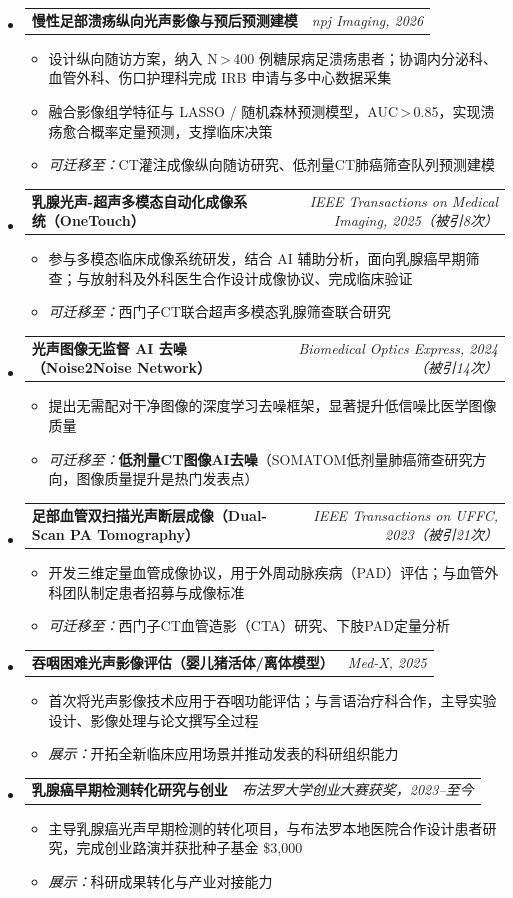 \documentclass[letterpaper,10pt]{article}
\makeatletter
\newcommand{\projheading}[2]{
  \vspace{1pt}\item
  \begin{tabular*}{0.97\textwidth}[t]{l@{\extracolsep{\fill}}r}
    \textbf{#1} & \textit{\small#2} \\
  \end{tabular*}\vspace{2pt}
}
\newcommand{\projItemListStart}{\begin{itemize}[leftmargin=0.2in, topsep=3pt]}
\newcommand{\projItemListEnd}{\end{itemize}\vspace{2pt}}
\makeatother
\begin{document}
\begin{itemize}[leftmargin=0in, label={}]

  \projheading{慢性足部溃疡纵向光声影像与预后预测建模}{npj Imaging, 2026}
  \projItemListStart
    \item 设计纵向随访方案，纳入 N\,>\,400 例糖尿病足溃疡患者；协调内分泌科、血管外科、伤口护理科完成 IRB 申请与多中心数据采集
    \item 融合影像组学特征与 LASSO / 随机森林预测模型，AUC\,>\,0.85，实现溃疡愈合概率定量预测，支撑临床决策
    \item \textit{可迁移至：}CT灌注成像纵向随访研究、低剂量CT肺癌筛查队列预测建模
  \projItemListEnd

  \projheading{乳腺光声-超声多模态自动化成像系统（OneTouch）}{IEEE Transactions on Medical Imaging, 2025（被引8次）}
  \projItemListStart
    \item 参与多模态临床成像系统研发，结合 AI 辅助分析，面向乳腺癌早期筛查；与放射科及外科医生合作设计成像协议、完成临床验证
    \item \textit{可迁移至：}西门子CT联合超声多模态乳腺筛查联合研究
  \projItemListEnd

  \projheading{光声图像无监督 AI 去噪（Noise2Noise Network）}{Biomedical Optics Express, 2024（被引14次）}
  \projItemListStart
    \item 提出无需配对干净图像的深度学习去噪框架，显著提升低信噪比医学图像质量
    \item \textit{可迁移至：}\textbf{低剂量CT图像AI去噪}（SOMATOM低剂量肺癌筛查研究方向，图像质量提升是热门发表点）
  \projItemListEnd

  \projheading{足部血管双扫描光声断层成像（Dual-Scan PA Tomography）}{IEEE Transactions on UFFC, 2023（被引21次）}
  \projItemListStart
    \item 开发三维定量血管成像协议，用于外周动脉疾病（PAD）评估；与血管外科团队制定患者招募与成像标准
    \item \textit{可迁移至：}西门子CT血管造影（CTA）研究、下肢PAD定量分析
  \projItemListEnd

  \projheading{吞咽困难光声影像评估（婴儿猪活体/离体模型）}{Med-X, 2025}
  \projItemListStart
    \item 首次将光声影像技术应用于吞咽功能评估；与言语治疗科合作，主导实验设计、影像处理与论文撰写全过程
    \item \textit{展示：}开拓全新临床应用场景并推动发表的科研组织能力
  \projItemListEnd

  \projheading{乳腺癌早期检测转化研究与创业}{布法罗大学创业大赛获奖，2023--至今}
  \projItemListStart
    \item 主导乳腺癌光声早期检测的转化项目，与布法罗本地医院合作设计患者研究，完成创业路演并获批种子基金 \$3,000
    \item \textit{展示：}科研成果转化与产业对接能力
  \projItemListEnd

\end{itemize}
\end{document}
